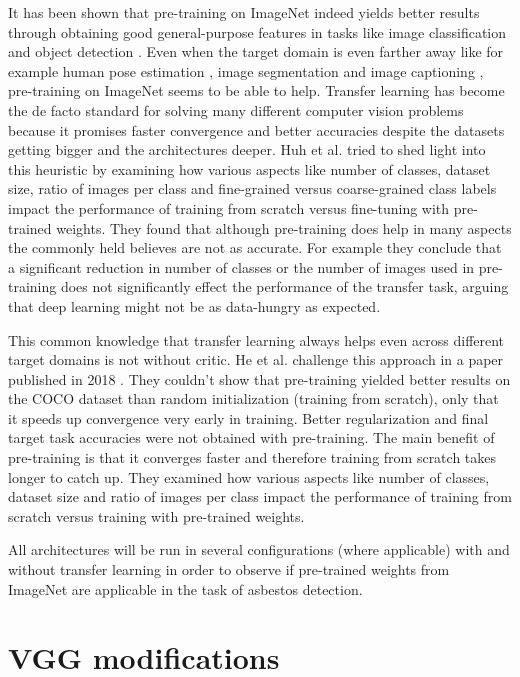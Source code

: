 It has been shown that pre-training on ImageNet indeed yields better results through obtaining good general-purpose features in tasks like image classification \cite{sharif2014cnn} and object detection \cite{girshick2014rich, sermanet2013overfeat}. Even when the target domain is even farther away like for example human pose estimation \cite{carreira2016human}, image segmentation \cite{dai2016instance} and image captioning \cite{donahue2015long, karpathy2015deep}, pre-training on ImageNet seems to be able to help. Transfer learning has become the de facto standard for solving many different computer vision problems because it promises faster convergence and better accuracies despite the datasets getting bigger and the architectures deeper. Huh et al. \cite{huh2016makes} tried to shed light into this heuristic by examining how various aspects like number of classes, dataset size, ratio of  images per class and fine-grained versus coarse-grained class labels impact the performance of training from scratch versus fine-tuning with pre-trained weights. They found that although pre-training does help in many aspects the commonly held believes are not as accurate. For example they conclude that a significant reduction in number of classes or the number of images used in pre-training does not significantly effect the performance of the transfer task, arguing that deep learning might not be as data-hungry as expected.

This common knowledge that transfer learning always helps even across different target domains is not without critic. He et al. challenge this approach in a paper published in 2018 \cite{he2018rethinking}. They couldn't show that pre-training yielded better results on the COCO dataset than random initialization (training from scratch), only that it speeds up convergence very early in training. Better regularization and final target task accuracies were not obtained with pre-training. The main benefit of pre-training is that it converges faster and therefore training from scratch takes longer to catch up. They examined how various aspects like number of classes, dataset size and ratio of images per class impact the performance of training from scratch versus training with pre-trained weights.

All architectures will be run in several configurations (where applicable) with and without transfer learning in order to observe if pre-trained weights from ImageNet are applicable in the task of asbestos detection.

\section{VGG modifications}

